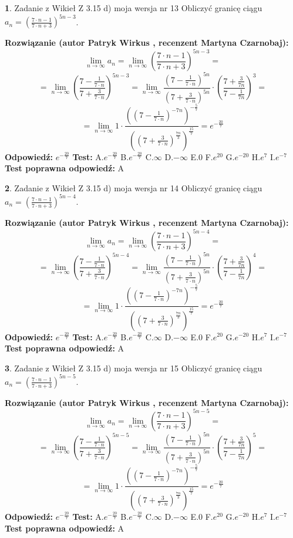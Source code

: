 \documentclass[12pt, a4paper]{article}
\theoremstyle{definition} %
\newtheorem{zad}{}
\newcommand{\zadStart}[1]{\begin{zad}#1\newline}
\newcommand{\zadStop}{\end{zad}}
\newcommand{\rozwStart}[2]{\noindent \textbf{Rozwiązanie (autor #1 , recenzent #2): }\newline}
\newcommand{\rozwStop}{\newline}
\newcommand{\odpStart}{\noindent \textbf{Odpowiedź:}\newline}
\newcommand{\odpStop}{\newline}
\newcommand{\testStart}{\noindent \textbf{Test:}\newline}
\newcommand{\testStop}{\newline}
\newcommand{\kluczStart}{\noindent \textbf{Test poprawna odpowiedź:}\newline}
\newcommand{\kluczStop}{\newline}
\begin{document}
\zadStart{Zadanie z Wikieł Z 3.15 d) moja wersja nr 13}
Obliczyć granicę ciągu $a_{n}=(\frac{7\cdot n - 1}{7 \cdot n + 3})^{5n-3}$.
\zadStop
\rozwStart{Patryk Wirkus}{Martyna Czarnobaj}
$$\lim\limits_{n\to\infty} a_{n} = \lim\limits_{n\to\infty}(\frac{7\cdot n - 1}{7 \cdot n + 3})^{5n-3}=$$
$$=\lim\limits_{n\to\infty}(\frac{7 - \frac{1}{7\cdot n}}{7 + \frac{3}{7 \cdot n}})^{5n-3}=\lim\limits_{n\to\infty}\frac{(7 - \frac{1}{7\cdot n})^{5n}}{(7 + \frac{3}{7\cdot n})^{5n}} \cdot (\frac{7+\frac{3}{7n}}{7-\frac{1}{7n}})^{3}=$$
$$=\lim\limits_{n\to\infty} 1 \cdot \frac{((7-\frac{1}{7 \cdot n})^{-7n})^{-\frac{5}{7}}}{((7+\frac{3}{7 \cdot n})^{\frac{7n}{3}})^{\frac{15}{7}}} =e^{-\frac{20}{7}}$$
\rozwStop
\odpStart
$e^{-\frac{20}{7}}$
\odpStop
\testStart
A.$ e^{-\frac{20}{7}}$
B.$ e^{-\frac{20}{7}}$
C.$\infty$
D.$-\infty$
E.$0$
F.$e^{20}$
G.$e^{-20}$
H.$e^{7}$
I.$e^{-7}$
\testStop
\kluczStart
A
\kluczStop



\zadStart{Zadanie z Wikieł Z 3.15 d) moja wersja nr 14}
Obliczyć granicę ciągu $a_{n}=(\frac{7\cdot n - 1}{7 \cdot n + 3})^{5n-4}$.
\zadStop
\rozwStart{Patryk Wirkus}{Martyna Czarnobaj}
$$\lim\limits_{n\to\infty} a_{n} = \lim\limits_{n\to\infty}(\frac{7\cdot n - 1}{7 \cdot n + 3})^{5n-4}=$$
$$=\lim\limits_{n\to\infty}(\frac{7 - \frac{1}{7\cdot n}}{7 + \frac{3}{7 \cdot n}})^{5n-4}=\lim\limits_{n\to\infty}\frac{(7 - \frac{1}{7\cdot n})^{5n}}{(7 + \frac{3}{7\cdot n})^{5n}} \cdot (\frac{7+\frac{3}{7n}}{7-\frac{1}{7n}})^{4}=$$
$$=\lim\limits_{n\to\infty} 1 \cdot \frac{((7-\frac{1}{7 \cdot n})^{-7n})^{-\frac{5}{7}}}{((7+\frac{3}{7 \cdot n})^{\frac{7n}{3}})^{\frac{15}{7}}} =e^{-\frac{20}{7}}$$
\rozwStop
\odpStart
$e^{-\frac{20}{7}}$
\odpStop
\testStart
A.$ e^{-\frac{20}{7}}$
B.$ e^{-\frac{20}{7}}$
C.$\infty$
D.$-\infty$
E.$0$
F.$e^{20}$
G.$e^{-20}$
H.$e^{7}$
I.$e^{-7}$
\testStop
\kluczStart
A
\kluczStop



\zadStart{Zadanie z Wikieł Z 3.15 d) moja wersja nr 15}
Obliczyć granicę ciągu $a_{n}=(\frac{7\cdot n - 1}{7 \cdot n + 3})^{5n-5}$.
\zadStop
\rozwStart{Patryk Wirkus}{Martyna Czarnobaj}
$$\lim\limits_{n\to\infty} a_{n} = \lim\limits_{n\to\infty}(\frac{7\cdot n - 1}{7 \cdot n + 3})^{5n-5}=$$
$$=\lim\limits_{n\to\infty}(\frac{7 - \frac{1}{7\cdot n}}{7 + \frac{3}{7 \cdot n}})^{5n-5}=\lim\limits_{n\to\infty}\frac{(7 - \frac{1}{7\cdot n})^{5n}}{(7 + \frac{3}{7\cdot n})^{5n}} \cdot (\frac{7+\frac{3}{7n}}{7-\frac{1}{7n}})^{5}=$$
$$=\lim\limits_{n\to\infty} 1 \cdot \frac{((7-\frac{1}{7 \cdot n})^{-7n})^{-\frac{5}{7}}}{((7+\frac{3}{7 \cdot n})^{\frac{7n}{3}})^{\frac{15}{7}}} =e^{-\frac{20}{7}}$$
\rozwStop
\odpStart
$e^{-\frac{20}{7}}$
\odpStop
\testStart
A.$ e^{-\frac{20}{7}}$
B.$ e^{-\frac{20}{7}}$
C.$\infty$
D.$-\infty$
E.$0$
F.$e^{20}$
G.$e^{-20}$
H.$e^{7}$
I.$e^{-7}$
\testStop
\kluczStart
A
\kluczStop
\end{document}
